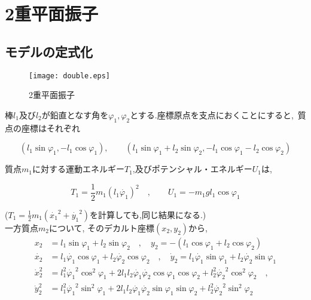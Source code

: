 \chapter{2重平面振子}

\section{モデルの定式化}

\begin{figure}[htbp]
  \begin{minipage}[b]{0.45\linewidth}
    \centering
    \texttt{[image: double.eps]}
    \caption{2重平面振子}
  \end{minipage}
\end{figure}

棒$l_1$及び$l_2$が鉛直となす角を$\varphi_1,\varphi_2$とする.座標原点を支点におくことにすると, 質点の座標はそれぞれ

\[
(l_1\sin\varphi_1, -l_1\cos\varphi_1), \qquad (l_1\sin\varphi_1+l_2\sin\varphi_2, -l_1\cos\varphi_1-l_2\cos\varphi_2)
\]

質点$m_1$に対する運動エネルギー$T_1$,及びポテンシャル・エネルギー$U_1$は,

\[
\displaystyle T_1=\frac{1}{2}m_1(l_1\dot{\varphi_1})^2\quad,\qquad U_1=-m_1gl_1\cos\varphi_1
\]

($\displaystyle T_1=\frac{1}{2}m_1(\dot{x_1}^2+\dot{y_1}^2)$を計算しても,同じ結果になる.)\\

一方質点$m_2$について, そのデカルト座標$(x_2,y_2)$から,
\begin{align*}
x_2&=l_1\sin\varphi_1+l_2\sin\varphi_2\quad,\quad y_2=-(l_1\cos\varphi_1+l_2\cos\varphi_2)\\
\dot{x_2}&=l_1\dot{\varphi_1}\cos\varphi_1+l_2\dot{\varphi_2}\cos\varphi_2\quad,\quad\dot{y}_2=l_1\dot{\varphi_1}\sin\varphi_1+l_2\dot{\varphi_2}\sin\varphi_1\\
\dot{x}_2^2&=l_1^2\dot{\varphi_1}^2\cos^2\varphi_1+2l_1l_2\dot{\varphi_1}\dot{\varphi_2}\cos\varphi_1\cos\varphi_2+l_2^2\dot{\varphi_2}^2\cos^2\varphi_2\quad,\\
\dot{y}_2^2&=l_1^2\dot{\varphi_1}^2\sin^2\varphi_1+2l_1l_2\dot{\varphi_1}\dot{\varphi_2}\sin\varphi_1\sin\varphi_2+l_2^2\dot{\varphi_2}^2\sin^2\varphi_2
\end{align*}

